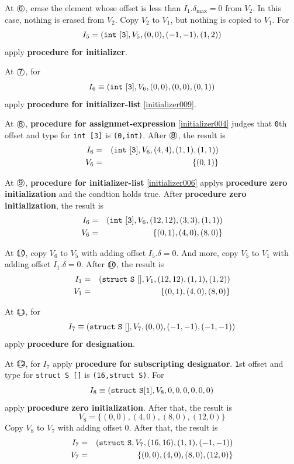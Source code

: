 \begin{Example}
\noindent
At $\MARU{\tt 6}$, erase the element whose offset is less than
$I_1.\delta_{\max} = 0$ from $V_2$.
In this case, nothing is erased from $V_2$.
Copy $V_2$ to $V_1$, but nothing is copied to $V_1$.
For
\[
 I_5 = ({\tt int\,\,[3]}, V_5, (0,0), (-1,-1),(1,2))
\]
apply {\bf procedure for initializer}.

\noindent
At $\MARU{\tt 7}$, for
\[
 I_6 \equiv ({\tt int\,\,[3]},V_6,(0,0),(0,0),(0,1))
\]
apply {\bf procedure for initializer-list} \ref{initializer009}.

\noindent
At $\MARU{\tt 8}$,
{\bf procedure for assignmet-expression}
\ref{initializer004} judges that
{\tt{0}}th offset and type for {\tt{int [3]}} is
{\tt{(0,int)}}. After $\MARU{\tt 8}$, the result is
\begin{eqnarray*}
I_6 & = & ({\tt{int\,\,[3]}},V_6,(4,4),(1,1),(1,1)) \\
V_6 & = & \{(0,1)\}
\end{eqnarray*}

\noindent
At $\MARU{\tt 9}$,
{\bf procedure for initializer-list} \ref{initializer006}
applys {\bf procedure zero initialization}
and the condtion holds true.
After {\bf procedure zero initialization}, the result is
\begin{eqnarray*}
I_6 & = & ({\tt{int\,\,[3]}},V_6,(12,12),(3,3),(1,1)) \\
V_6 & = & \{(0,1), (4,0), (8,0)\}
\end{eqnarray*}

\noindent
At $\MARU{\tt 10}$,
copy $V_6$ to $V_5$ with adding offset $I_5.\delta = 0$.
And more, copy $V_5$ to $V_1$ with adding offset $I_1.\delta = 0$.
After $\MARU{\tt 10}$, the result is
\begin{eqnarray*}
I_1 & = & ({\tt{struct\,\,S\,\,[]}},V_1,(12,12),(1,1),(1,2))  \\
V_1 & = & \{(0,1), (4,0), (8,0)\}
\end{eqnarray*}

\noindent
At $\MARU{\tt 11}$, for
\[
I_7 \equiv ({\tt struct\,\,S\,\,[]}, V_7, (0,0), (-1,-1),(-1,-1))
\]
apply
{\bf procedure for designation}.

\noindent
At $\MARU{\tt 12}$, for $I_7$ apply
{\bf procedure for subscripting designator}.
{\tt{1}}st offset and type for {\tt{struct S []}}
is {\tt(16,struct S)}. For
\[
 I_8 \equiv ({\tt{struct\,\,S[1]}},V_8,0,0,0,0,0,0)
\]
apply {\bf procedure zero initialization}.
After that, the result is
\[
 V_8 = \{(0,0), (4,0), (8,0), (12,0) \}
\]
Copy $V_8$  to $V_7$ with adding offset $0$.
After that, the result is
\begin{eqnarray*}
I_7 & = & ({\tt struct\,\,S}, V_7, (16,16), (1,1),(-1,-1)) \\
V_7 & = & \{(0,0), (4,0), (8,0), (12,0) \}
\end{eqnarray*}


\end{Example}
